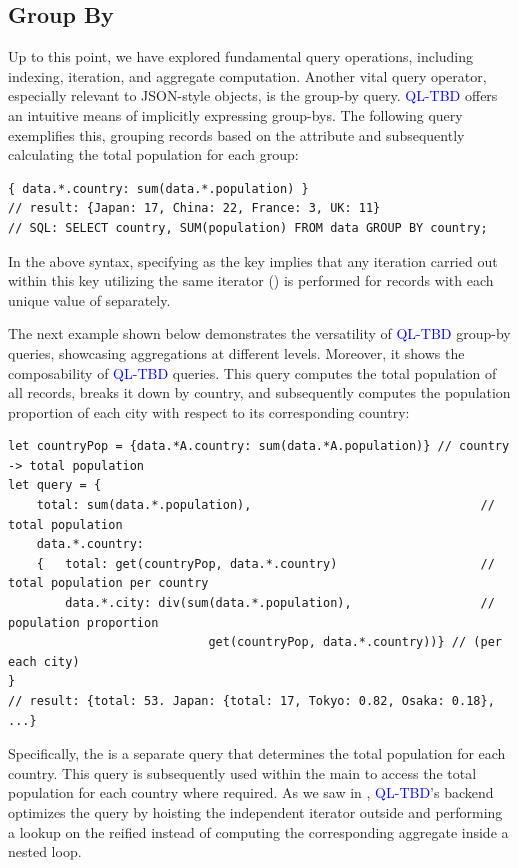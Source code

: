 \documentclass[runningheads]{llncs}
\newcommand{\lang}{\textcolor{blue}{QL-TBD}}
\begin{document}
\subsection{Group By}\label{subsec:groupby}
Up to this point, we have explored fundamental query operations, including indexing,
iteration, and aggregate computation.
Another vital query operator, especially relevant to JSON-style objects,
is the group-by query.
\lang{} offers an intuitive means of implicitly expressing group-bys.
The following query exemplifies this, grouping records based on the
 attribute and subsequently calculating the total population
for each group:

\begin{lstlisting}[style=JavaScript, columns=flexible, numbers=none]
{ data.*.country: sum(data.*.population) }
// result: {Japan: 17, China: 22, France: 3, UK: 11}
// SQL: SELECT country, SUM(population) FROM data GROUP BY country;
\end{lstlisting}

In the above syntax, specifying  as the key implies
that any iteration carried out within this key utilizing the same
iterator (\inline{*}) is performed for records with each unique value of 
separately.

The next example shown below demonstrates the versatility of \lang{} group-by queries, showcasing
aggregations at different levels.
Moreover, it shows the composability of \lang{} queries.
This query computes the total population of all records, breaks it down by country,
and subsequently computes the population proportion of each city with respect to its
corresponding country:

\begin{lstlisting}[style=JavaScript, columns=flexible, numbers=none]
let countryPop = {data.*A.country: sum(data.*A.population)} // country -> total population
let query = { 
    total: sum(data.*.population),                                // total population
    data.*.country:
    {   total: get(countryPop, data.*.country)                    // total population per country
        data.*.city: div(sum(data.*.population),                  // population proportion
                            get(countryPop, data.*.country))} // (per each city)
}
// result: {total: 53. Japan: {total: 17, Tokyo: 0.82, Osaka: 0.18}, ...}
\end{lstlisting}

Specifically, the  is a separate query that determines the total
population for each country.
This query is subsequently used within the main  to access the
total population for each country where required.
As we saw in , \lang{}'s backend optimizes the
query by hoisting the independent  iterator outside and performing
a lookup on the reified  instead of computing the
corresponding aggregate inside a nested loop.
\end{document}
